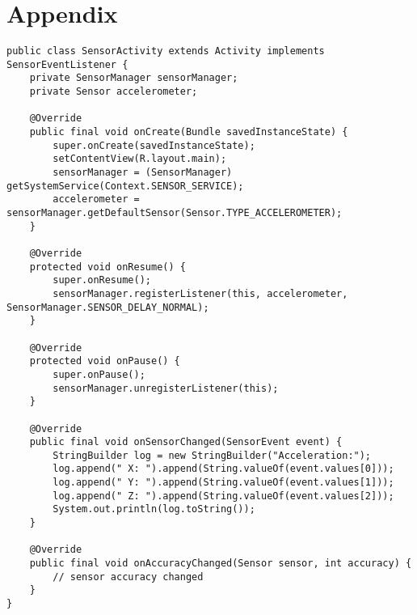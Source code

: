 \appendix
\section{Appendix}
\label{sec:appendix}

\begin{lstlisting}[caption=Activity with lifecycle callbacks, label=basicactivity]
public class SensorActivity extends Activity implements SensorEventListener {
	private SensorManager sensorManager;
	private Sensor accelerometer;

	@Override
	public final void onCreate(Bundle savedInstanceState) {
		super.onCreate(savedInstanceState);
		setContentView(R.layout.main);
		sensorManager = (SensorManager) getSystemService(Context.SENSOR_SERVICE);
		accelerometer = sensorManager.getDefaultSensor(Sensor.TYPE_ACCELEROMETER);
	}

	@Override
	protected void onResume() {
		super.onResume();
		sensorManager.registerListener(this, accelerometer, SensorManager.SENSOR_DELAY_NORMAL);
	}

	@Override
	protected void onPause() {
		super.onPause();
		sensorManager.unregisterListener(this);
	}

	@Override
	public final void onSensorChanged(SensorEvent event) {
		StringBuilder log = new StringBuilder("Acceleration:");
		log.append(" X: ").append(String.valueOf(event.values[0]));
		log.append(" Y: ").append(String.valueOf(event.values[1]));
		log.append(" Z: ").append(String.valueOf(event.values[2]));
		System.out.println(log.toString());
	}

	@Override
	public final void onAccuracyChanged(Sensor sensor, int accuracy) {
		// sensor accuracy changed
	}
}
\end{lstlisting}

\clearpage